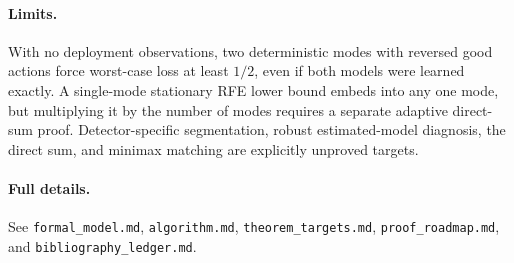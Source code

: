 \documentclass[11pt]{article}
\begin{document}
\paragraph{Limits.}
With no deployment observations, two deterministic modes with reversed good
actions force worst-case loss at least \(1/2\), even if both models were
learned exactly.  A single-mode stationary RFE lower bound embeds into any one
mode, but multiplying it by the number of modes requires a separate adaptive
direct-sum proof.  Detector-specific segmentation, robust estimated-model
diagnosis, the direct sum, and minimax matching are explicitly unproved
targets.

\paragraph{Full details.}
See \texttt{formal\_model.md}, \texttt{algorithm.md},
\texttt{theorem\_targets.md}, \texttt{proof\_roadmap.md}, and
\texttt{bibliography\_ledger.md}.
\end{document}

